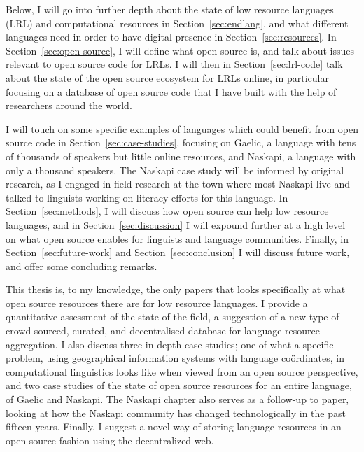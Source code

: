 Below, I will go into further depth about the state of low resource languages (LRL) and computational resources in Section~\ref{sec:endlang}, and what different languages need in order to have digital presence in Section~\ref{sec:resources}. In Section~\ref{sec:open-source}, I will define what open source is, and talk about issues relevant to open source code for LRLs. I will then in Section~\ref{sec:lrl-code} talk about the state of the open source ecosystem for LRLs online, in particular focusing on a database of open source code that I have built with the help of researchers around the world.

I will touch on some specific examples of languages which could benefit from open source code in Section~\ref{sec:case-studies}, focusing on Gaelic, a language with tens of thousands of speakers but little online resources, and Naskapi, a language with only a thousand speakers. The Naskapi case study will be informed by original research, as I engaged in field research at the town where most Naskapi live and talked to linguists working on literacy efforts for this language. In Section~\ref{sec:methods}, I will discuss how open source can help low resource languages, and in Section~\ref{sec:discussion} I will expound further at a high level on what open source enables for linguists and language communities. Finally, in Section~\ref{sec:future-work} and Section~\ref{sec:conclusion} I will discuss future work, and offer some concluding remarks.

This thesis is, to my knowledge, the only papers that looks specifically at what open source resources there are for low resource languages. I provide a quantitative assessment of the state of the field, a suggestion of a new type of crowd-sourced, curated, and decentralised database for language resource aggregation. I also discuss three in-depth case studies; one of what a specific problem, using geographical information systems with language co\"{o}rdinates, in computational linguistics looks like when viewed from an open source perspective, and two case studies of the state of open source resources for an entire language, of Gaelic and Naskapi. The Naskapi chapter also serves as a follow-up to  paper, looking at how the Naskapi community has changed technologically in the past fifteen years. Finally, I suggest a novel way of storing language resources in an open source fashion using the decentralized web.
